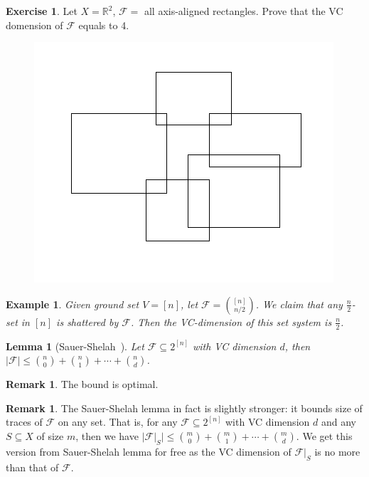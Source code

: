 \documentclass{article}
\newtheorem{lemma}[theorem]{Lemma}
\newtheorem{example}[theorem]{Example}
\theoremstyle{definition}
\newtheorem{remark}[theorem]{Remark}
\newtheorem{exercise}[theorem]{Exercise}
\begin{document}
 \begin{exercise}
    Let $X=\mathbb{R}^2$, $\mathcal{F}=$ all axis-aligned rectangles. Prove that the VC domension of $\mathcal{F}$ equals to 4.
    \begin{figure}[H]
        \centering
        \includegraphics[scale=0.5]{15-2.png}
    \end{figure}
\end{exercise}

\begin{example}
    Given ground set $V = [n]$, let $\mathcal{F} = \binom{[n]}{n/2}$. We claim that any $\frac{n}{2}$-set in $[n]$ is shattered by $\mathcal{F}$. Then the VC-dimension of this set system is $\frac{n}{2}$.
\end{example}


\begin{lemma} [Sauer-Shelah~\cite{sauer1972density,shelah1972combinatorial}]\label{F}
    Let $\mathcal{F}\subseteq 2^{[n]}$ with VC dimension $d$, then $|\mathcal{F}|\leq \binom{n}{0}+\binom{n}{1}+\cdots+\binom{n}{d}$.
\end{lemma}

\begin{remark}
The bound is optimal.
\end{remark}

\begin{remark}
The Sauer-Shelah lemma in fact is slightly stronger: it bounds size of traces of $\mathcal{F}$ on any set. That is, for any $\mathcal{F}\subseteq 2^{[n]}$ with VC dimension $d$ and any $S\subseteq X$ of size $m$, then we have $|\mathcal{F}|_{S}|\leq \binom{m}{0}+\binom{m}{1}+\cdots+\binom{m}{d}$. We get this version from Sauer-Shelah lemma for free as the VC dimension of $\mathcal{F}|_{S}$ is no more than that of $\mathcal{F}$.
\end{remark}
\end{document}
